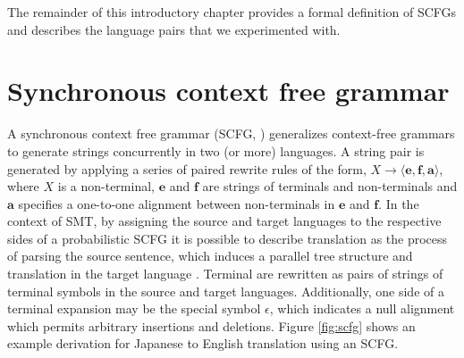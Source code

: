 The remainder of this introductory chapter provides a formal definition of SCFGs and describes the language pairs that we experimented with.

\section{Synchronous context free grammar} \label{sec:scfg}

A synchronous context free grammar (SCFG, \cite{lewis68scfg}) generalizes context-free grammars to generate strings concurrently in two (or more) languages. A string pair is generated by applying a series of paired rewrite rules of the form, $X \rightarrow \langle \mathbf{e}, \mathbf{f}, \mathbf{a} \rangle$, where $X$ is a non-terminal, $\mathbf{e}$ and $\mathbf{f}$ are strings of terminals and non-terminals and $\mathbf{a}$ specifies a one-to-one alignment between non-terminals in $\mathbf{e}$ and $\mathbf{f}$.
In the context of SMT, by assigning the source and target languages to the respective sides of a probabilistic SCFG it is possible to describe translation as the process of parsing the source sentence, which induces a parallel tree structure and translation in the target language \cite{chiang07hierarchical}.  
Terminal are rewritten as pairs of strings of terminal symbols in the source and target languages.  Additionally, one side of a terminal expansion may be the special symbol $\epsilon$, which indicates a null alignment which permits arbitrary insertions and deletions.
Figure \ref{fig:scfg} shows an example derivation for Japanese to English translation using an SCFG.

